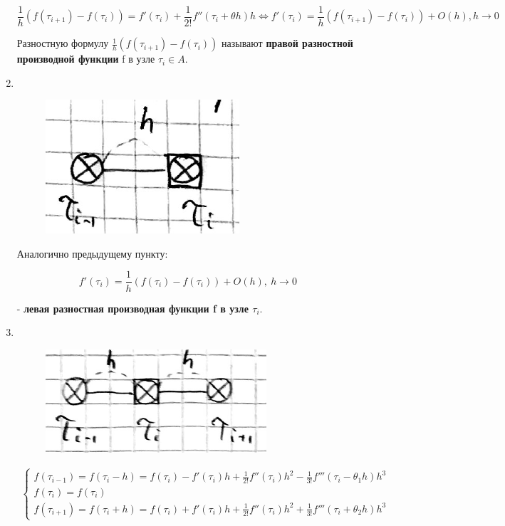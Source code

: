 \documentclass[__main__.tex]{subfiles}
\begin{document}
\begin{enumerate}
	\begin{equation}
	\frac{1}{h} \left( f\left( \tau_{i+1}\right) - f \left( \tau_i \right)\right) = f' \left( \tau_i \right) + \frac{1}{2!} f''\left( \tau_i + \theta h \right) h \Leftrightarrow f'\left( \tau_i \right) = \frac{1}{h} \left(f\left( \tau_{i+1}\right) - f \left( \tau_i \right) \right) + O \left(h\right), h\rightarrow 0
	\end{equation}
	
	Разностную формулу $\frac{1}{h} \left( f\left( \tau_{i+1}\right) - f \left( \tau_i \right) \right)$ называют \textbf{правой разностной производной функции} f в узле $\tau_i \in A$.
	
	\item $ $
	\begin{figure}[h!]
		\centering
		\includegraphics[width=0.05\linewidth]{img/img_5.3}
		\caption{}
		\label{img_5.3}
	\end{figure}
	Аналогично предыдущему пункту:
	
	\begin{equation}\label{5.5}
	f'\left( \tau_i \right) = \frac{1}{h} \left( f\left(\tau_i\right) - f\left( \tau_i \right) \right) + O \left( h \right), \ h \rightarrow 0
	\end{equation}
	
	- \textbf{левая разностная производная функции f в узле $\tau_i$}.
	
	\item $ $
	\begin{figure}[h!]
		\centering
		\includegraphics[width=0.05\linewidth]{img/img_5.4}
		\caption{}
		\label{img_5.4}
	\end{figure}
	
	\begin{gather}
	\begin{cases}
	f\left( \tau_{i-1} \right) = f \left( \tau_i - h \right) = f \left( \tau_i \right) - f'\left(\tau_i\right)h + \frac{1}{2!} f''\left( \tau_i \right) h^2 - \frac{1}{3!} f'''\left( \tau_i - \theta_1 h \right) h^3 \\
	f\left(\tau_i \right) = f\left(\tau_i \right) \\
	f\left( \tau_{i+1} \right) = f \left( \tau_i + h \right) = f\left( \tau_i \right) + f'\left( \tau_i \right) h + \frac{1}{2!}f''\left( \tau_i \right) h^2 + \frac{1}{3!} f'''\left( \tau_i + \theta_2 h \right)h^3
	\end{cases}
	\end{gather}
	

\end{enumerate}
\end{document}
